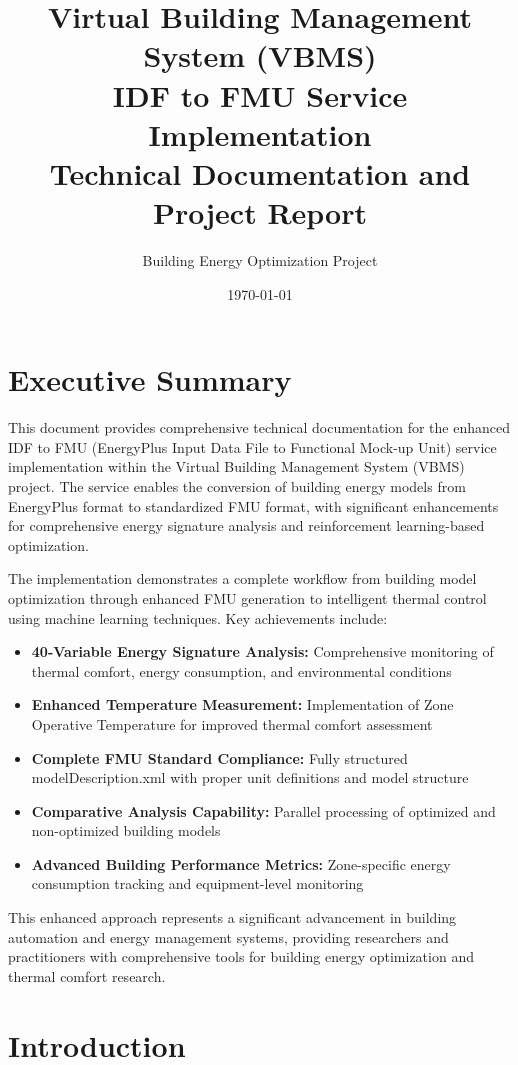 \documentclass[12pt,a4paper]{article}
\title{\textbf{Virtual Building Management System (VBMS)\\
IDF to FMU Service Implementation\\
\large Technical Documentation and Project Report}}
\author{Building Energy Optimization Project}
\date{\today}
\begin{document}
\maketitle

\tableofcontents
\newpage

\section{Executive Summary}

This document provides comprehensive technical documentation for the enhanced IDF to FMU (EnergyPlus Input Data File to Functional Mock-up Unit) service implementation within the Virtual Building Management System (VBMS) project. The service enables the conversion of building energy models from EnergyPlus format to standardized FMU format, with significant enhancements for comprehensive energy signature analysis and reinforcement learning-based optimization.

The implementation demonstrates a complete workflow from building model optimization through enhanced FMU generation to intelligent thermal control using machine learning techniques. Key achievements include:

\begin{itemize}
    \item \textbf{40-Variable Energy Signature Analysis:} Comprehensive monitoring of thermal comfort, energy consumption, and environmental conditions
    \item \textbf{Enhanced Temperature Measurement:} Implementation of Zone Operative Temperature for improved thermal comfort assessment
    \item \textbf{Complete FMU Standard Compliance:} Fully structured modelDescription.xml with proper unit definitions and model structure
    \item \textbf{Comparative Analysis Capability:} Parallel processing of optimized and non-optimized building models
    \item \textbf{Advanced Building Performance Metrics:} Zone-specific energy consumption tracking and equipment-level monitoring
\end{itemize}

This enhanced approach represents a significant advancement in building automation and energy management systems, providing researchers and practitioners with comprehensive tools for building energy optimization and thermal comfort research.

\section{Introduction}
\end{document}
